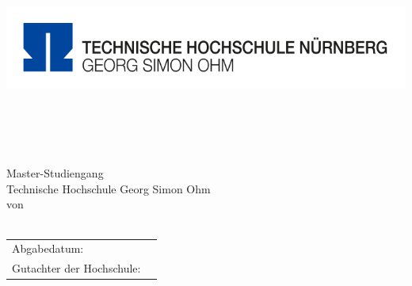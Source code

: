 \thispagestyle{plain}
\begin{titlepage}
\enlargethispage{3.5cm}
\sffamily 								%
\begin{minipage}{\textwidth}
	\vspace{-2cm}
	\noindent \includegraphics[scale=0.2]{Images/Logo_TH.png} \hfill
\end{minipage} 
\begin{center}

\huge{\textsc{\textbf{\titel}}}\\[1.5ex]
\Large{\textbf{\untertitel}}\\[5ex]
\LARGE{\textbf{\ausarbeitung}}\\[2ex]
\normalsize{~}\\[3ex]
\Large{Master-Studiengang \textit{\studiengang}}\\[1ex]
\normalsize{Technische Hochschule Georg Simon Ohm}\\[5ex]
von\\[1ex] \autor \\[12ex]

\begin{tabular}{ll}
	Abgabedatum:					& \quad \abgabeTH \\ 
	
	Gutachter der Hochschule: & \quad \betreuerth \\ 
	
\end{tabular} 

\end{center}

\end{titlepage}
\onehalfspacing